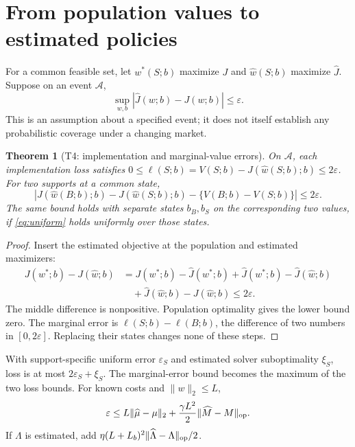 \documentclass[11pt,a4paper]{article}
\newtheorem{theorem}{Theorem}
\theoremstyle{remark}\newtheorem{remark}[theorem]{Remark}
\newcommand{\norm}[1]{\lVert#1\rVert}\newcommand{\pos}[1]{[#1]_+}
\begin{document}
\section{From population values to estimated policies}
For a common feasible set, let $w^*(S;b)$ maximize $J$ and
$\widehat w(S;b)$ maximize $\widehat J$. Suppose on an event $\mathcal A$,
\begin{equation}
 \sup_{w,b}|\widehat J(w;b)-J(w;b)|\le\varepsilon.\label{eq:uniform}
\end{equation}
This is an assumption about a specified event; it does not itself establish
any probabilistic coverage under a changing market.

\begin{theorem}[T4: implementation and marginal-value errors]
On $\mathcal A$, each implementation loss satisfies
$0\le\ell(S;b)=V(S;b)-J(\widehat w(S;b);b)\le2\varepsilon$.
For two supports at a common state,
\begin{equation}
 \left|J(\widehat w(B;b);b)-J(\widehat w(S;b);b)
       -\{V(B;b)-V(S;b)\}\right|\le2\varepsilon.
\end{equation}
The same bound holds with separate states $b_B,b_S$ on the corresponding two
values, if \eqref{eq:uniform} holds uniformly over those states.
\end{theorem}
\begin{proof}
Insert the estimated objective at the population and estimated maximizers:
\begin{align*}
 J(w^*;b)-J(\widehat w;b)
 &=J(w^*;b)-\widehat J(w^*;b)
   +\widehat J(w^*;b)-\widehat J(\widehat w;b)\\
 &\quad+\widehat J(\widehat w;b)-J(\widehat w;b)\le2\varepsilon.
\end{align*}
The middle difference is nonpositive. Population optimality gives the lower
bound zero. The marginal error is $\ell(S;b)-\ell(B;b)$, the difference of
two numbers in $[0,2\varepsilon]$. Replacing their states changes none of
these steps.
\end{proof}

With support-specific uniform error $\varepsilon_S$ and estimated solver
suboptimality $\xi_S$, loss is at most $2\varepsilon_S+\xi_S$.
The marginal-error bound becomes the maximum of the two loss bounds.
For known costs and $\norm w_2\le L$,
\begin{equation}
 \varepsilon\le L\norm{\widehat\mu-\mu}_2
       +\frac{\gamma L^2}{2}\norm{\widehat M-M}_{\op}.
\end{equation}
If $\Lambda$ is estimated, add
$\eta(L+L_b)^2\norm{\widehat\Lambda-\Lambda}_{\op}/2$.
\end{document}
